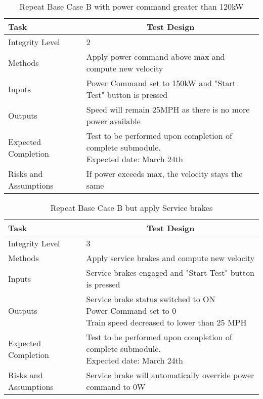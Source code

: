 \documentclass[]{article}
\begin{document}
	\begin{table}[H]
		\centering
		\caption{Repeat Base Case B with power command greater than 120kW }
		\begin{tabular}{|l|l|}
			\hline
			Task & \multicolumn{1}{c|}{Test Design} \\ \hline
			Integrity Level & 2 \\ \hline
			Methods & Apply power command above max and compute new velocity  \\ \hline
			Inputs &  Power Command set to 150kW and "Start Test" button is pressed \\ \hline
			Outputs &  Speed will remain 25MPH as there is no more power available  \\ \hline
			Expected Completion & \parbox[t]{10cm}{Test to be performed upon completion of complete submodule.\\ Expected date: March 24th}\\ \hline
			Risks and Assumptions & If power exceeds max, the velocity stays the same\\ \hline
		\end{tabular}
	\end{table}

	\begin{table}[H]
		\centering
		\caption{Repeat Base Case B but apply Service brakes}
		\begin{tabular}{|l|l|}
			\hline
			Task & \multicolumn{1}{c|}{Test Design} \\ \hline
			Integrity Level & 3 \\ \hline
			Methods & Apply service brakes and compute new velocity  \\ \hline
			Inputs &  Service brakes engaged and "Start Test" button is pressed \\ \hline
			Outputs & \parbox[t]{10cm}{ Service brake status switched to ON\\ Power Command set to 0\\ Train speed decreased to lower than 25 MPH  }\\ \hline
			Expected Completion & \parbox[t]{10cm}{Test to be performed upon completion of complete submodule.\\ Expected date: March 24th}\\ \hline
			Risks and Assumptions & Service brake will automatically override power command to 0W\\ \hline
		\end{tabular}
	\end{table}
\end{document}
